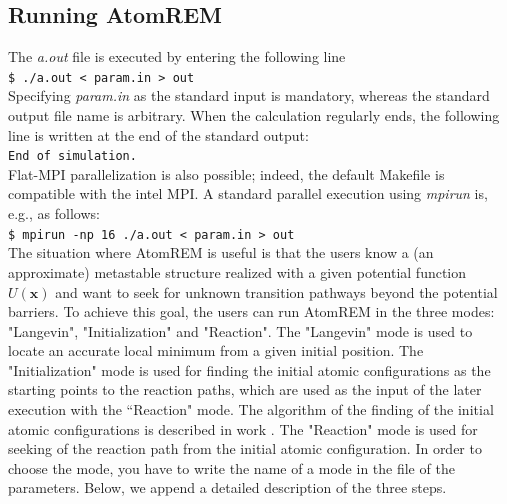 \documentclass[preprint,12pt]{elsarticle}
\newcounter{bla}
\begin{document}


\subsection{Running AtomREM}
\label{sec:running}
The {\it a.out} file is executed by entering the following line\\
{\tt \$ ./a.out < param.in > out}\\
Specifying {\it param.in} as the standard input is mandatory, whereas the standard output file name is arbitrary. When the calculation regularly ends, the following line is written at the end of the standard output: \\
{\tt End of simulation.}\\
Flat-MPI parallelization is also possible; indeed, the default Makefile is compatible with the intel MPI. A standard parallel execution using {\it mpirun} is, e.g., as follows:\\
{\tt \$ mpirun -np 16 ./a.out < param.in > out}\\

The situation where AtomREM is useful is that the users know a (an approximate) metastable structure realized with a given potential function $U({\bm x})$ and want to seek for unknown transition pathways beyond the potential barriers. To achieve this goal, the users can run AtomREM in the three modes: "Langevin", "Initialization" and "Reaction". The "Langevin" mode is used to locate an accurate local minimum from a given initial position. The "Initialization" mode is used for finding the initial atomic configurations as the starting points to the reaction paths, which are used as the input of the later execution with the ``Reaction" mode. The algorithm of the finding of the initial atomic configurations is described in work \cite{Nagornov}. The "Reaction" mode is used for seeking of the reaction path from the initial atomic configuration. In order to choose the mode, you have to write the name of a mode in the file of the parameters. Below, we append a detailed description of the three steps.
\end{document}
